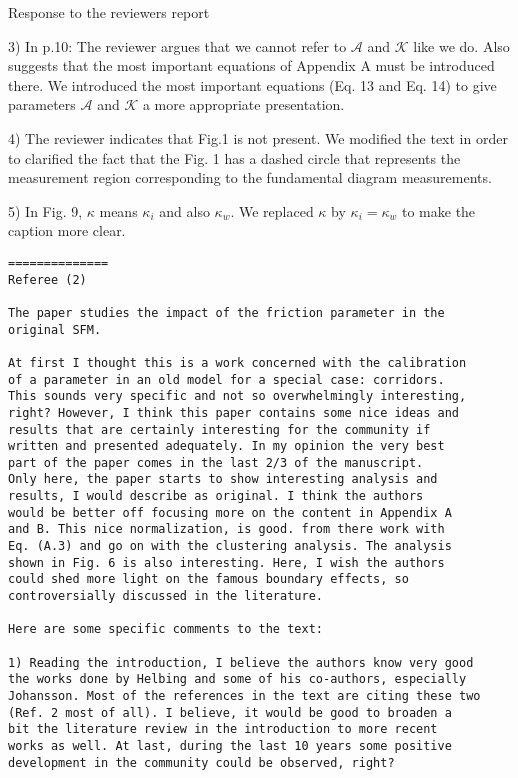 \documentclass[a4paper,12pt]{letter}
\begin{document}
\begin{letter}{Response to the reviewers report}
{3) In p.10: The reviewer argues that we cannot refer to $\mathcal{A}$ and $\mathcal{K}$ like we do. Also suggests that the most important equations of Appendix A must be introduced there. We introduced the most important equations (Eq. 13 and Eq. 14) to give parameters $\mathcal{A}$ and $\mathcal{K}$ a more appropriate presentation. 

4) The reviewer indicates that Fig.1 is not present. We modified the text in order to clarified the fact that the Fig. 1 has a 
dashed circle that represents the measurement region corresponding to the fundamental diagram measurements. 

5) In Fig. 9, $\kappa$ means $\kappa_i$ and also $\kappa_w$. We replaced $\kappa$ by $\kappa_i = \kappa_w$ to make the caption more clear.   


}

\newpage

\begin{verbatim}
==============
Referee (2)

The paper studies the impact of the friction parameter in the 
original SFM.

At first I thought this is a work concerned with the calibration 
of a parameter in an old model for a special case: corridors. 
This sounds very specific and not so overwhelmingly interesting,
right? However, I think this paper contains some nice ideas and 
results that are certainly interesting for the community if 
written and presented adequately. In my opinion the very best 
part of the paper comes in the last 2/3 of the manuscript.
Only here, the paper starts to show interesting analysis and 
results, I would describe as original. I think the authors 
would be better off focusing more on the content in Appendix A
and B. This nice normalization, is good. from there work with 
Eq. (A.3) and go on with the clustering analysis. The analysis 
shown in Fig. 6 is also interesting. Here, I wish the authors 
could shed more light on the famous boundary effects, so
controversially discussed in the literature.

Here are some specific comments to the text:

1) Reading the introduction, I believe the authors know very good 
the works done by Helbing and some of his co-authors, especially 
Johansson. Most of the references in the text are citing these two 
(Ref. 2 most of all). I believe, it would be good to broaden a 
bit the literature review in the introduction to more recent 
works as well. At last, during the last 10 years some positive 
development in the community could be observed, right?


\end{verbatim}
\end{letter}
\end{document}
